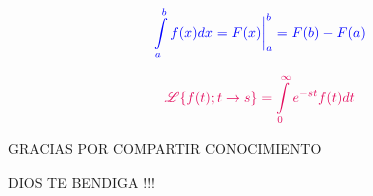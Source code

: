 \documentclass[11pt]{article}
\begin{document}
      \begin{equation*}
          \textcolor{blue}{\int\limits_{a}^{b}f(x)dx = F(x)\bigg|_{a}^{b} = F(b)-F(a)}
      \end{equation*}

      \begin{equation*}
          \textcolor{violeta}{\mathscr{L}{\{ f(t); t \to s\}} = \int\limits_{0}^{\infty}e^{-st}f(t)dt}
      \end{equation*}

      \begin{center}
          GRACIAS POR COMPARTIR CONOCIMIENTO 
      \end{center}
      \begin{center}
        DIOS TE BENDIGA !!!
    \end{center}
\end{document}
